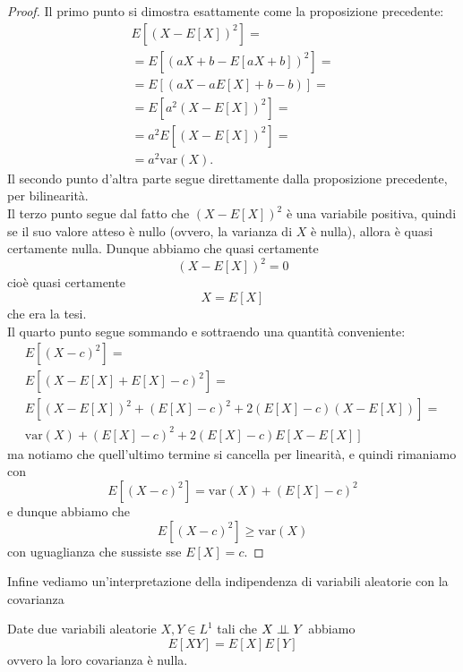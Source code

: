 \documentclass[11pt]{scrartcl}
\begin{document}
	\begin{proof}
		Il primo punto si dimostra esattamente come la proposizione precedente:
		\begin{align*}
			E\left[(X-E[X])^2\right]=\\
			=E\left[(aX+b-E[aX+b])^2\right]=\\
			=E\left[(aX-aE[X]+b-b)\right]=\\
			=E\left[a^2(X-E[X])^2\right]=\\
			=a^2E\left[(X-E[X])^2\right]=\\
			=a^2\text{var}(X).
		\end{align*}
		Il secondo punto d'altra parte segue direttamente dalla proposizione precedente, per bilinearità. \\
		Il terzo punto segue dal fatto che $(X-E[X])^2$ è una variabile positiva, quindi se il suo valore atteso è nullo (ovvero, la varianza di $X$ è nulla), allora è quasi certamente nulla. Dunque abbiamo che quasi certamente 
		$$(X-E[X])^2=0$$
		cioè quasi certamente
		$$X=E[X]$$
		che era la tesi. \\
		Il quarto punto segue sommando e sottraendo una quantità conveniente:
		\begin{align*}
			E[(X-c)^2]= \\
			E\left[(X-E[X]+E[X]-c)^2\right]=\\
			E\left[(X-E[X])^2+(E[X]-c)^2+2(E[X]-c)(X-E[X])\right]=\\
			\text{var}(X)+(E[X]-c)^2+2(E[X]-c)E\left[X-E[X]\right]
		\end{align*}
		ma notiamo che quell'ultimo termine si cancella per linearità, e quindi rimaniamo con 
		$$E[(X-c)^2]=\text{var}(X)+(E[X]-c)^2$$
		e dunque abbiamo che 
		$$E[(X-c)^2]\ge \text{var}(X)$$
		con uguaglianza che sussiste sse $E[X]=c$.
	\end{proof}
	Infine vediamo un'interpretazione della indipendenza di variabili aleatorie con la covarianza
	\begin{lemma}
		Date due variabili aleatorie $X,Y\in L^1$ tali che $X\indep Y$ abbiamo
		$$E[XY]=E[X]E[Y]$$
		ovvero la loro covarianza è nulla.
	\end{lemma}
\end{document}
